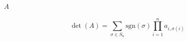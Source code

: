 \documentclass{article}
\begin{document}
$ A $
\pagebreak

\[  \det(A) = \sum_{\sigma \in S_n} \text{sgn}(\sigma) \prod_{i=1}^n
a_{i,\sigma(i)}
\]
\pagebreak
\end{document}
